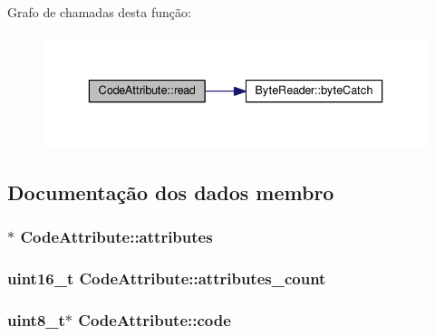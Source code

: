 Grafo de chamadas desta função\+:
\nopagebreak
\begin{figure}[H]
\begin{center}
\leavevmode
\includegraphics[width=336pt]{class_code_attribute_ae5c7888c59b2a2990798c597c014a2ac_cgraph}
\end{center}
\end{figure}




\subsection{Documentação dos dados membro}
\subsubsection[{\texorpdfstring{attributes}{attributes}}]{$\ast$ Code\+Attribute\+::attributes}\hypertarget{class_code_attribute_a99297a4945c876dd5615d84986043c21}{}\label{class_code_attribute_a99297a4945c876dd5615d84986043c21}
\subsubsection[{\texorpdfstring{attributes\+\_\+count}{attributes_count}}]{\setlength{\rightskip}{0pt plus 5cm}uint16\+\_\+t Code\+Attribute\+::attributes\+\_\+count}\hypertarget{class_code_attribute_a7a5c471692a3376b19d7b55b034b7c45}{}\label{class_code_attribute_a7a5c471692a3376b19d7b55b034b7c45}
\subsubsection[{\texorpdfstring{code}{code}}]{\setlength{\rightskip}{0pt plus 5cm}uint8\+\_\+t$\ast$ Code\+Attribute\+::code}\hypertarget{class_code_attribute_a95d8e9c3e0b93220defcbc9852ec6c27}{}\label{class_code_attribute_a95d8e9c3e0b93220defcbc9852ec6c27}
